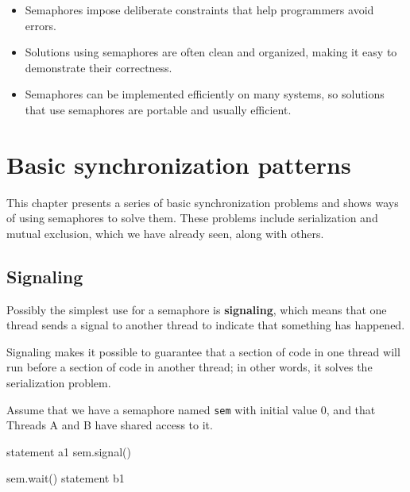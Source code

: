 \documentclass{book}
\begin{document}
\begin{itemize}

    \item Semaphores impose deliberate constraints that help
          programmers avoid errors.

    \item Solutions using semaphores are often clean and organized,
          making it easy to demonstrate their correctness.

    \item Semaphores can be implemented efficiently on many systems,
          so solutions that use semaphores are portable and usually
          efficient.

\end{itemize}


\chapter{Basic synchronization patterns}

This chapter presents a series of basic synchronization problems and
shows ways of using semaphores to solve them.  These problems include
serialization and mutual exclusion, which we have already seen, along
with others.

\section{Signaling}

Possibly the simplest use for a semaphore is {\bf signaling},
which means that one thread sends a signal to another
thread to indicate that something has happened.

Signaling makes it possible to guarantee
that a section of code in one thread will run before a section of
code in another thread; in other words, it solves the serialization
problem.

Assume that we have a semaphore named {\tt sem} with initial value
0, and that Threads A and B have shared access to it.

\begin{minipage}[t]{0.4\textwidth}
    \begin{unbreakable}[title={Thread A}]{}
statement a1
sem.signal()
\end{unbreakable}
\end{minipage}
\hfill
\begin{minipage}[t]{0.4\textwidth}
    \begin{unbreakable}[title={Thread B}]{}
sem.wait()
statement b1
\end{unbreakable}
\end{minipage}
\end{document}
